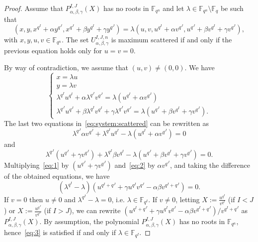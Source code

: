 \begin{proof}
Assume that $P^{I,J}_{\alpha,\beta,\gamma}(X)$ has no roots in $\mathbb{F}_{q^n}$ and let $\lambda \in \mathbb{F}_{q^n}\setminus \mathbb{F}_q$ be such that 
\begin{equation}
\label{eq:0}
    \left(x,y,x^{q^I}+\alpha y^{q^J},x^{q^J}+\beta y^{q^I} + \gamma y^{q^J}\right) = \lambda \left(u,v,u^{q^I}+\alpha v^{q^J},u^{q^J}+\beta v^{q^I} + \gamma v^{q^J}\right),
\end{equation}
with $x,y,u,v \in \mathbb{F}_{q^n}$.
The set $U_{\alpha, \beta, \gamma}^{I,J,n}$ is maximum scattered if and only if the previous equation holds only for $u=v=0$. 

By way of contradiction, we assume that $(u,v)\neq (0,0)$.  We have 
\begin{equation}
\label{eq:system:scattered}
    \begin{cases}
    x=\lambda u\\
    y = \lambda v\\
    \lambda^{q^I}u^{q^I} + \alpha\lambda^{q^J}v^{q^J} = \lambda\left(u^{q^I}+\alpha v^{q^J}\right)\\
    \lambda^{q^J}u^{q^J} + \beta\lambda^{q^I}v^{q^I} + \gamma\lambda^{q^J}v^{q^J} = \lambda\left(u^{q^J}+\beta v^{q^I} + \gamma v^{q^J}\right).
    \end{cases}
\end{equation}
The last two equations in~\eqref{eq:system:scattered} can be rewritten as 
\begin{equation}
\label{eq:1}
  \lambda^{q^J}\alpha v^{q^J} + \lambda^{q^I}u^{q^I} - \lambda\left(u^{q^I}+\alpha v^{q^J}\right) = 0 
\end{equation}
and
\begin{equation}
\label{eq:2}
 \lambda^{q^J}\left(u^{q^J} + \gamma v^{q^J}\right) + \lambda^{q^I}\beta v^{q^I} - \lambda\left(u^{q^J}+\beta v^{q^I} + \gamma v^{q^J}\right) = 0.
\end{equation}
Multiplying~\eqref{eq:1} by $\left(u^{q^J} + \gamma v^{q^J}\right)$ and~\eqref{eq:2} by $\alpha v^{q^J}$, and taking the difference of the obtained equations, we have 
\begin{equation}
\label{eq:3}
    \left(\lambda^{q^I} - \lambda\right)\left(u^{q^I + q^J} + \gamma u^{q^I}v^{q^J} - \alpha\beta v^{q^I + q^J}\right) = 0.
\end{equation}
If $v=0$ then $u\neq 0$ and $\lambda^{q^I} - \lambda=0$, i.e. $\lambda \in \mathbb{F}_{q^I}$. If $v\neq 0$, letting $X:=\frac{u^{q^I}}{v^{q^I}}$ (if $I < J$) or $X:=\frac{u^{q^J}}{v^{q^J}}$ (if $I > J$), we can rewrite $ (u^{q^I + q^J} + \gamma u^{q^I}v^{q^J} - \alpha\beta v^{q^I + q^J} )/v^{q^I+q^J}$ as $P^{I,J}_{\alpha,\beta,\gamma}(X)$.
By assumption, the  polynomial $P^{I,J}_{\alpha,\beta,\gamma}(X)$ has no roots in $\mathbb{F}_{q^n}$, hence~\eqref{eq:3} is satisfied if and only if $\lambda\in \mathbb{F}_{q^I}$.




\end{proof}
